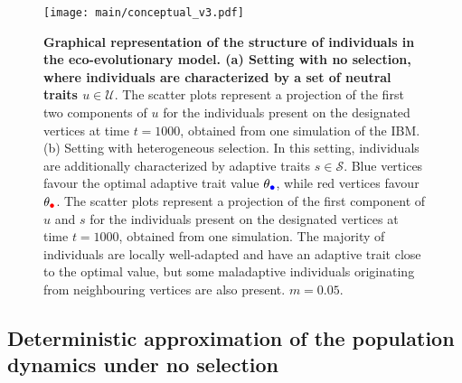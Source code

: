 \begin{figure}[t]%
  \centering
  \texttt{[image: main/conceptual\_v3.pdf]}
  \caption{\textbf{Graphical representation of the structure of individuals in the eco-evolutionary model. (a) Setting with no selection, where individuals are characterized by a set of neutral traits $u \in \mathcal{U}$}. The scatter plots represent a projection of the first two components of $u$ for the individuals present on the designated vertices at time $t=1000$, obtained from one simulation of the IBM.\\
  (b) Setting with heterogeneous selection. In this setting, individuals are additionally characterized by adaptive traits $s \in \mathcal{S}$. Blue vertices favour the optimal adaptive trait value $\theta_{\bcirc}$, while red vertices favour $\theta_{\rcirc}$. The scatter plots represent a projection of the first component of $u$ and $s$ for the individuals present on the designated vertices at time $t = 1000$, obtained from one simulation. The majority of individuals are locally well-adapted and have an adaptive trait close to the optimal value, but some maladaptive individuals originating from neighbouring vertices are also present. $m = 0.05$.}
  \label{fig:conceptual}
\end{figure}
\FloatBarrier

\subsection{Deterministic approximation of the population dynamics under no selection}\label{sec:212}

